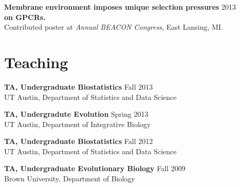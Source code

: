 \documentclass[line, margin]{res}
\begin{document}
\begin{resume}
\textbf{Membrane environment imposes unique selection pressures} \hfill 2013 \\ \textbf{on GPCRs.} \\ Contributed poster at \emph{Annual BEACON Congress}, East Lansing, MI.

\vspace{0.75cm}


\section{Teaching} 


\textbf{TA, Undergraduate Biostatistics} \hfill Fall 2013 \\ UT Austin, Department of Statistics and Data Science

\textbf{TA, Undergradute Evolution} \hfill Spring 2013 \\ UT Austin, Department of Integrative Biology

\textbf{TA, Undergraduate Biostatistics} \hfill Fall 2012 \\ UT Austin, Department of 
Statistics and Data Science

\textbf{TA, Undergraduate Evolutionary Biology} \hfill Fall 2009 \\ Brown University, Department of Biology 



\end{resume}
\end{document}
